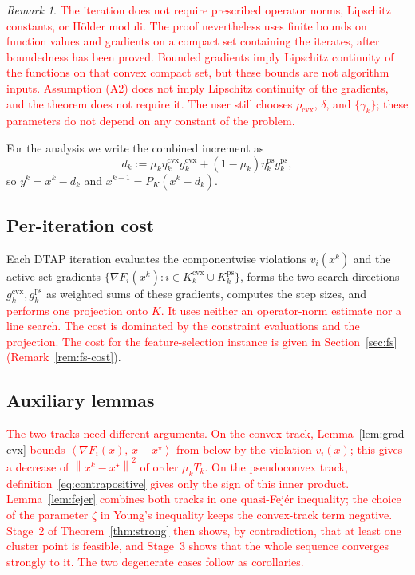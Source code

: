 \documentclass[]{interact}
\theoremstyle{plain}
\theoremstyle{definition}
\theoremstyle{remark}
\newtheorem{remark}{Remark}
\newcommand{\norm}[1]{\left\lVert #1 \right\rVert}
\newcommand{\inner}[2]{\left\langle #1,\, #2 \right\rangle}
\newcommand{\cvx}{\mathrm{cvx}}
\newcommand{\ps}{\mathrm{ps}}
\newcommand{\dtap}{\textsc{DTAP}}
\begin{document}
\begin{remark}\label{rem:regularity-scope}
\leavevmode\textcolor{red}{The iteration does not require prescribed operator norms, Lipschitz constants, or
H\"older moduli. The proof nevertheless uses finite bounds on function values and
gradients on a compact set containing the iterates, after boundedness has been proved.
Bounded gradients imply Lipschitz continuity of the functions on that convex compact set,
but these bounds are not algorithm inputs. Assumption (A2) does not
imply Lipschitz continuity of the gradients, and the theorem does not require it.
The user still chooses $\rho_{\cvx}$, $\delta$, and $\{\gamma_k\}$; these parameters do not
depend on any constant of the problem.}
\end{remark}

For the analysis we write the combined increment as
\begin{equation}\label{eq:dk}
d_k:=\mu_k\eta^{\cvx}_k g^{\cvx}_k+(1-\mu_k)\eta^{\ps}_k g^{\ps}_k,
\end{equation}
so $y^k=x^k-d_k$ and $x^{k+1}=P_K(x^k-d_k)$.
\subsection{Per-iteration cost}\label{ssec:complexity}
Each \dtap{} iteration evaluates the
componentwise violations $v_i(x^k)$ and the active-set gradients $\{\nabla F_i(x^k):i\in
K^{\cvx}_k\cup K^{\ps}_k\}$, forms the two search directions $g^{\cvx}_k,g^{\ps}_k$ as weighted
sums of these gradients, computes the step sizes, and \leavevmode\textcolor{red}{performs one projection onto $K$.
It uses neither an operator-norm estimate nor a line search. The cost is dominated by
the constraint evaluations and the projection. The cost for the feature-selection instance
is given in Section~\ref{sec:fs}
(Remark~\ref{rem:fs-cost}}).

\subsection{Auxiliary lemmas}\label{ssec:aux}
\leavevmode\textcolor{red}{The two tracks need different arguments. On the convex track, Lemma~\ref{lem:grad-cvx} bounds
$\inner{\nabla F_i(x)}{x-x^\star}$ from below by the violation $v_i(x)$; this gives a decrease of
$\norm{x^k-x^\star}^2$ of order $\mu_kT_k$. On the pseudoconvex track,
definition~\eqref{eq:contrapositive} gives only the sign of this inner product.
Lemma~\ref{lem:fejer} combines both tracks in one quasi-Fej\'er inequality; the choice of the
parameter $\zeta$ in Young's inequality keeps the convex-track term negative. Stage~2 of
Theorem~\ref{thm:strong} then shows, by contradiction, that at least one cluster point is
feasible, and Stage~3 shows that the whole sequence converges strongly to it. The two degenerate cases
follow as corollaries.}
\end{document}
